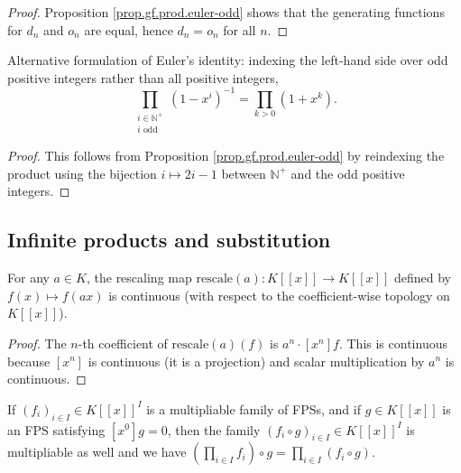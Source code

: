 \begin{proof}
Proposition \ref{prop.gf.prod.euler-odd} shows that
the generating functions for $d_n$ and $o_n$ are equal, hence $d_n = o_n$ for all $n$.
\end{proof}

\begin{proposition}
\label{prop.gf.prod.euler-odd-alt}
\leanhelper
\leanok
Alternative formulation of Euler's identity: indexing the left-hand side
over odd positive integers rather than all positive integers,
\[
\prod_{\substack{i\in\mathbb{N}^{+}\\i\text{ odd}}}
\left(1-x^i\right)^{-1} = \prod_{k>0}\left(1+x^k\right).
\]
\end{proposition}

\begin{proof}
\leanok
This follows from Proposition \ref{prop.gf.prod.euler-odd} by reindexing
the product using the bijection $i\mapsto 2i-1$ between $\mathbb{N}^{+}$
and the odd positive integers.
\end{proof}

\subsection{Infinite products and substitution}

\begin{lemma}
\label{lem.fps.continuous-rescale}
\leanhelper
\leanok
For any $a\in K$, the rescaling map $\mathrm{rescale}(a) : K[[x]]\to K[[x]]$
defined by $f(x)\mapsto f(ax)$ is continuous (with respect to the
coefficient-wise topology on $K[[x]]$).
\end{lemma}

\begin{proof}
The $n$-th coefficient of $\mathrm{rescale}(a)(f)$ is $a^n\cdot [x^n]f$.
This is continuous because $[x^n]$ is continuous (it is a projection)
and scalar multiplication by $a^n$ is continuous.
\end{proof}

\begin{proposition}
\label{prop.fps.subs.rule-infprod}
\leantarget
\leanok
If $\left(  f_{i}\right)  _{i\in I}\in
K\left[  \left[  x\right]  \right]  ^{I}$ is a multipliable family of FPSs,
and if $g\in K\left[  \left[  x\right]  \right]  $ is an FPS satisfying
$\left[  x^{0}\right]  g=0$, then the family $\left(  f_{i}\circ g\right)
_{i\in I}\in K\left[  \left[  x\right]  \right]  ^{I}$ is multipliable as well
and we have $\left(  \prod_{i\in I}f_{i}\right)  \circ g=\prod_{i\in I}\left(
f_{i}\circ g\right)  $.
\end{proposition}

